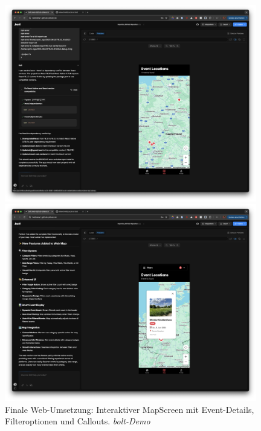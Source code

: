 \begin{figure}[htbp]
      \centering
      \vspace{1em}
      \begin{minipage}{0.48\textwidth}
            \centering
            \includegraphics[width=0.98\textwidth]{images/bolt_screenshots/funktionierender map screen.png}
      \end{minipage}
      \hfill
      \begin{minipage}{0.48\textwidth}
            \centering
            \includegraphics[width=0.98\textwidth]{images/bolt_screenshots/funktionierender map screen + callout & filter angewendet.png}
      \end{minipage}
      \caption{Finale Web-Umsetzung: Interaktiver MapScreen mit Event-Details, Filteroptionen und Callouts. \textit{bolt-Demo}}
      \label{fig:bolt-final}
\end{figure}

